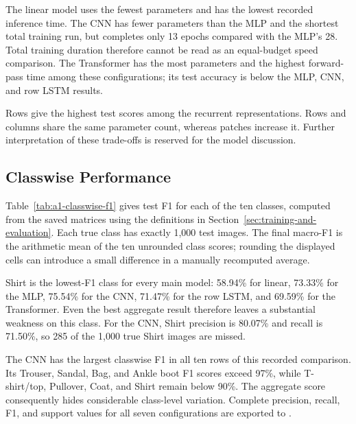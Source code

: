 The linear model uses the fewest parameters and has the lowest recorded inference time. The CNN has fewer parameters than the MLP and the shortest total training run, but completes only 13 epochs compared with the MLP's 28. Total training duration therefore cannot be read as an equal-budget speed comparison. The Transformer has the most parameters and the highest forward-pass time among these configurations; its test accuracy is below the MLP, CNN, and row LSTM results.

Rows give the highest test scores among the recurrent representations. Rows and columns share the same parameter count, whereas patches increase it. Further interpretation of these trade-offs is reserved for the model discussion.

\subsection{Classwise Performance}

Table~\ref{tab:a1-classwise-f1} gives test F1 for each of the ten classes, computed from the saved matrices using the definitions in Section~\ref{sec:training-and-evaluation}. Each true class has exactly 1,000 test images. The final macro-F1 is the arithmetic mean of the ten unrounded class scores; rounding the displayed cells can introduce a small difference in a manually recomputed average.

\begin{table}[H]
    \centering
    \caption{Classwise test F1 (\%) for the five main configurations. Bold marks the largest unrounded value in each row. Every class has support 1,000.}
    \label{tab:a1-classwise-f1}
    \small
    \setlength{\tabcolsep}{6pt}
    
\end{table}

Shirt is the lowest-F1 class for every main model: 58.94\% for linear, 73.33\% for the MLP, 75.54\% for the CNN, 71.47\% for the row LSTM, and 69.59\% for the Transformer. Even the best aggregate result therefore leaves a substantial weakness on this class. For the CNN, Shirt precision is 80.07\% and recall is 71.50\%, so 285 of the 1,000 true Shirt images are missed.

The CNN has the largest classwise F1 in all ten rows of this recorded comparison. Its Trouser, Sandal, Bag, and Ankle boot F1 scores exceed 97\%, while T-shirt/top, Pullover, Coat, and Shirt remain below 90\%. The aggregate score consequently hides considerable class-level variation. Complete precision, recall, F1, and support values for all seven configurations are exported to .

